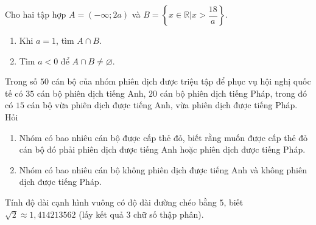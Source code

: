 \begin{bt}%
	Cho hai tập hợp $A=(-\infty;2a)$ và $B=\left\{ x\in \mathbb{R}|x>\dfrac{18}{a}\right\}$.
	\begin{enumerate}
		\item Khi $a=1$, tìm $A\cap B$.
		\item Tìm $a<0$ để $A\cap B\neq \varnothing$.
	\end{enumerate}
\end{bt}

\begin{bt}%
	Trong số $50$ cán bộ của nhóm phiên dịch được triệu tập để phục vụ hội nghị quốc tế có $35$ cán bộ phiên dịch tiếng Anh, $20$ cán bộ phiên dịch tiếng Pháp, trong đó có $15$ cán bộ vừa phiên dịch được tiếng Anh, vừa phiên dịch được tiếng Pháp. Hỏi
	\begin{enumerate}
		\item Nhóm có bao nhiêu cán bộ được cấp thẻ đỏ, biết rằng muốn được cấp thẻ đỏ cán bộ đó phải phiên dịch được tiếng Anh hoặc phiên dịch được tiếng Pháp.
		\item Nhóm có bao nhiêu cán bộ không phiên dịch được tiếng Anh và không phiên dịch được tiếng Pháp.
	\end{enumerate}
\end{bt}

\begin{bt}%
	Tính độ dài cạnh hình vuông có độ dài đường chéo bằng $5$, biết $ \sqrt{2} \approx 1,414213562 $ (lấy kết quả 3 chữ số thập phân).
\end{bt}
